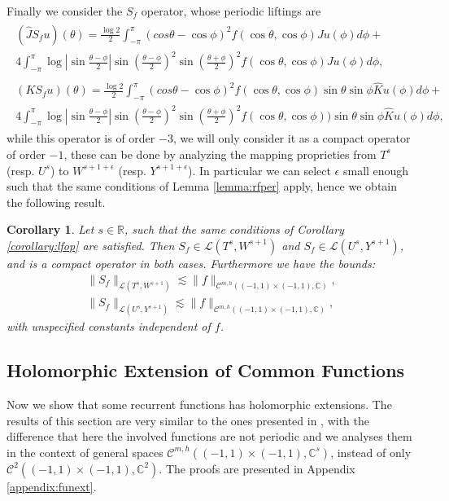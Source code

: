 \documentclass{article}
\newtheorem{corollary}[theorem]{Corollary}
\newcommand{\IC}{{\mathbb C}}
\newcommand{\IR}{{\mathbb R}}
\newcommand{\cmspace}[3]{\mathcal{C}^{#1} \left( #2, #3 \right)}
\newcommand{\cmspaceh}[4]{\mathcal{C}^{#1,#2} \left( #3, #4 \right)}
\newcommand{\iinterv}{(-1,1)\times(-1,1)}
\begin{document}
Finally we consider the $S_f$ operator, whose periodic liftings are 
\begin{align*}
\begin{split}
(\widehat{J}S_fu)(\theta) = \frac{\log 2}{2}\int_{-\pi}^\pi
(cos \theta - \cos \phi)^2 f(\cos \theta, \cos \phi)Ju(\phi) d\phi +\\
4 \int_{-\pi}^\pi \log \left\vert \sin \frac{\theta-\phi}{2} \right\vert \sin\left( \frac{\theta-\phi}{2} \right)^2
\sin\left( \frac{\theta+\phi}{2} \right)^2 f(\cos \theta, \cos \phi) Ju (\phi) d \phi, 
\end{split} \\
\begin{split}
(K S_fu)(\theta) = \frac{\log 2}{2}\int_{-\pi}^\pi
(cos \theta - \cos \phi)^2 f(\cos \theta, \cos \phi)\sin \theta \sin \phi \widehat{K}u(\phi) d\phi +\\
4 \int_{-\pi}^\pi \log \left\vert \sin \frac{\theta-\phi}{2} \right\vert \sin\left( \frac{\theta-\phi}{2} \right)^2
\sin\left( \frac{\theta+\phi}{2} \right)^2 f(\cos \theta, \cos \phi) )\sin \theta \sin \phi \widehat{K}u (\phi) d \phi, 
\end{split} 
\end{align*}
while this operator is of order $-3$, we will only consider it as a compact operator of order $-1$, these can be done by analyzing the mapping proprieties from $T^s$ (resp. $U^s$) to $W^{s+1+\epsilon}$ (resp. $Y^{s+1+\epsilon}$). In particular we can select $\epsilon$ small enough such that the same conditions of Lemma \ref{lemma:rfper} apply, hence we obtain the following result. 

\begin{corollary}
\label{corollary:sfop}
Let $s \in \IR$, such that the same conditions of Corollary \ref{corollary:lfop} are satisfied. Then
 $ S_f  \in \mathcal{L}(T^{s},W^{s+1})$ and  $S_f  \in \mathcal{L}(U^{s},Y^{s+1})$, and is a compact operator in both cases. Furthermore we have the bounds: 
\begin{align*}
\| S_f\|_{ \mathcal{L}(T^{s},W^{s+1})} \lesssim \|f\|_{\cmspaceh{m}{h}{\iinterv}{\IC}},\\
\| S_f\|_{ \mathcal{L}(U^{s},Y^{s+1})} \lesssim \|f\|_{\cmspaceh{m}{h}{\iinterv}{\IC}},
\end{align*}
with unspecified constants independent of $f$.
\end{corollary}

\subsection{Holomorphic Extension of Common Functions}
\label{sec:funext}
Now we show that some recurrent functions has holomorphic extensions. The results of this section are very similar to the ones presented  in \cite{Henriquez2021}, with the difference that here the involved functions are not periodic and we analyses them in the context of general spaces $\cmspaceh{m}{h}{\iinterv}{\IC^s}$, instead of only $\cmspace{2}{\iinterv}{\IC^2}$. The proofs are presented in Appendix \ref{appendix:funext}.
\end{document}
